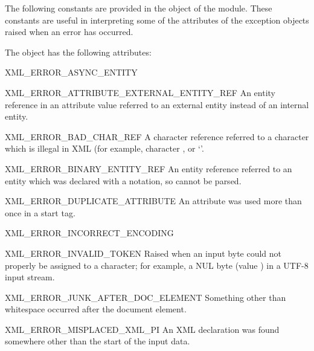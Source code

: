 The following constants are provided in the  object of
the  module.  These constants are useful
in interpreting some of the attributes of the 
exception objects raised when an error has occurred.

The  object has the following attributes:

\begin{datadescni}{XML_ERROR_ASYNC_ENTITY}
\end{datadescni}

\begin{datadescni}{XML_ERROR_ATTRIBUTE_EXTERNAL_ENTITY_REF}
An entity reference in an attribute value referred to an external
entity instead of an internal entity.
\end{datadescni}

\begin{datadescni}{XML_ERROR_BAD_CHAR_REF}
A character reference referred to a character which is illegal in XML
(for example, character , or `'.
\end{datadescni}

\begin{datadescni}{XML_ERROR_BINARY_ENTITY_REF}
An entity reference referred to an entity which was declared with a
notation, so cannot be parsed.
\end{datadescni}

\begin{datadescni}{XML_ERROR_DUPLICATE_ATTRIBUTE}
An attribute was used more than once in a start tag.
\end{datadescni}

\begin{datadescni}{XML_ERROR_INCORRECT_ENCODING}
\end{datadescni}

\begin{datadescni}{XML_ERROR_INVALID_TOKEN}
Raised when an input byte could not properly be assigned to a
character; for example, a NUL byte (value ) in a UTF-8 input
stream.
\end{datadescni}

\begin{datadescni}{XML_ERROR_JUNK_AFTER_DOC_ELEMENT}
Something other than whitespace occurred after the document element.
\end{datadescni}

\begin{datadescni}{XML_ERROR_MISPLACED_XML_PI}
An XML declaration was found somewhere other than the start of the
input data.
\end{datadescni}

